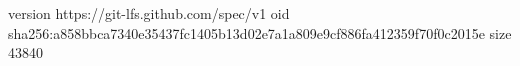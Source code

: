 version https://git-lfs.github.com/spec/v1
oid sha256:a858bbca7340e35437fc1405b13d02e7a1a809e9cf886fa412359f70f0c2015e
size 43840
